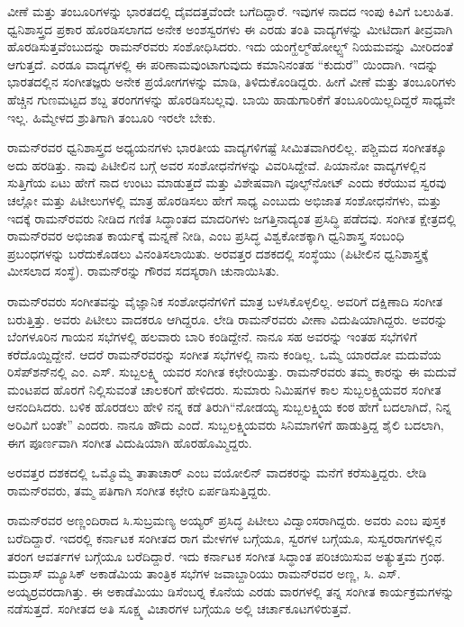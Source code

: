 ವೀಣೆ ಮತ್ತು ತಂಬೂರಿಗಳನ್ನು ಭಾರತದಲ್ಲಿ ದೈವದತ್ತವೆಂದೇ ಬಗೆದಿದ್ದಾರೆ. ಇವುಗಳ ನಾದದ ಇಂಪು ಕಿವಿಗೆ ಬಲುಹಿತ. ಧ್ವನಿಶಾಸ್ತ್ರದ ಪ್ರಕಾರ ಹೊರಡಿಸಲಾಗದ ಅನೇಕ ಅಂಶಸ್ವರಗಳು ಈ ಎರಡು ತಂತಿ ವಾದ್ಯಗಳನ್ನು ಮೀಟಿದಾಗ ತೀವ್ರವಾಗಿ ಹೊರಡಿಸುತ್ತವೆಂಬುದನ್ನು ರಾಮನ್‍ರವರು ಸಂಶೋಧಿಸಿದರು. ಇದು ಯಂಗ್\enginline{-}ಹೆಲ್ಮ್‌ಹೋಲ್ಟ್ಸ್ ನಿಯಮವನ್ನು ಮೀರಿದಂತೆ ಆಗುತ್ತದೆ. ಎರಡೂ ವಾದ್ಯಗಳಲ್ಲಿ ಈ ಪರಿಣಾಮವುಂಟಾಗುವುದು ಕಮಾನಿನಂತಹ “ಕುದುರೆ” ಯಿಂದಾಗಿ. ಇದನ್ನು ಭಾರತದಲ್ಲಿನ ಸಂಗೀತಜ್ಞರು ಅನೇಕ ಪ್ರಯೋಗಗಳನ್ನು ಮಾಡಿ, ತಿಳಿದುಕೊಂಡಿದ್ದರು. ಹೀಗೆ ವೀಣೆ ಮತ್ತು ತಂಬೂರಿಗಳು ಹೆಚ್ಚಿನ ಗುಣಮಟ್ಟದ ಶಬ್ದ ತರಂಗಗಳನ್ನು ಹೊರಡಿಸಬಲ್ಲವು. ಬಾಯಿ ಹಾಡುಗಾರಿಕೆಗೆ ತಂಬೂರಿಯಿಲ್ಲದಿದ್ದರೆ ಸಾಧ್ಯವೇ ಇಲ್ಲ. ಹಿಮ್ಮೇಳದ ಶ್ರುತಿಗಾಗಿ ತಂಬೂರಿ ಇರಲೇ ಬೇಕು.

ರಾಮನ್‍ರವರ ಧ್ವನಿಶಾಸ್ತ್ರದ ಅಧ್ಯಯನಗಳು ಭಾರತೀಯ ವಾದ್ಯಗಳಿಗಷ್ಟೆ ಸೀಮಿತವಾಗಿರಲಿಲ್ಲ. ಪಶ್ಚಿಮದ ಸಂಗೀತಕ್ಕೂ ಅದು ಹರಡಿತ್ತು. ನಾವು ಪಿಟೀಲಿನ ಬಗ್ಗೆ ಅವರ ಸಂಶೋಧನೆಗಳನ್ನು ವಿವರಿಸಿದ್ದೇವೆ. ಪಿಯಾನೋ ವಾದ್ಯಗಳಲ್ಲಿನ ಸುತ್ತಿಗೆಯ ಏಟು ಹೇಗೆ ನಾದ ಉಂಟು ಮಾಡುತ್ತದೆ ಮತ್ತು ವಿಶೇಷವಾಗಿ ವೂಲ್ಫ್‌ನೋಟ್ ಎಂದು ಕರೆಯುವ ಸ್ವರವು ಚಲ್ಲೋ ಮತ್ತು ಪಿಟೀಲುಗಳಲ್ಲಿ ಮಾತ್ರ ಹೊರಡಿಸಲು ಹೇಗೆ ಸಾಧ್ಯ ಎಂಬುದು ಅಭಿಜಾತ ಸಂಶೋಧನೆಗಳು, ಮತ್ತು ಇದಕ್ಕೆ ರಾಮನ್‍ರವರು ನೀಡಿದ ಗಣಿತ ಸಿದ್ಧಾಂತದ ಮಾದರಿಗಳು ಜಗತ್ತಿನಾದ್ಯಂತ ಪ್ರಸಿದ್ಧಿ ಪಡೆದವು. ಸಂಗೀತ ಕ್ಷೇತ್ರದಲ್ಲಿ ರಾಮನ್‍ರವರ ಅಭಿಜಾತ ಕಾರ್ಯಕ್ಕೆ ಮನ್ನಣೆ ನೀಡಿ, \textit{} ಎಂಬ ಪ್ರಸಿದ್ಧ ವಿಶ್ವಕೋಶಕ್ಕಾಗಿ ಧ್ವನಿಶಾಸ್ತ್ರ ಸಂಬಂಧಿ ಪ್ರಬಂಧಗಳನ್ನು ಬರೆದುಕೊಡಲು ವಿನಂತಿಸಲಾಯಿತು. ಅರವತ್ತರ ದಶಕದಲ್ಲಿ  ಸಂಸ್ಥೆಯು (ಪಿಟೀಲಿನ ಧ್ವನಿಶಾಸ್ತ್ರಕ್ಕೆ ಮೀಸಲಾದ ಸಂಸ್ಥೆ). ರಾಮನ್‍ರನ್ನು ಗೌರವ ಸದಸ್ಯರಾಗಿ ಚುನಾಯಿಸಿತು.

ರಾಮನ್‍ರವರು ಸಂಗೀತವನ್ನು ವೈಜ್ಞಾನಿಕ ಸಂಶೋಧನೆಗಳಿಗೆ ಮಾತ್ರ ಬಳಸಿಕೊಳ್ಳಲಿಲ್ಲ. ಅವರಿಗೆ ದಕ್ಷಿಣಾದಿ ಸಂಗೀತ ಬರುತ್ತಿತ್ತು. ಅವರು ಪಿಟೀಲು ವಾದಕರೂ ಆಗಿದ್ದರೂ. ಲೇಡಿ ರಾಮನ್‍ರವರು ವೀಣಾ ವಿದುಷಿಯಾಗಿದ್ದರು. ಅವರನ್ನು ಬೆಂಗಳೂರಿನ ಗಾಯನ ಸಭೆಗಳಲ್ಲಿ ಹಲವಾರು ಬಾರಿ ಕಂಡಿದ್ದೇನೆ. ನಾನೂ ಸಹ ಅವರನ್ನು ಇಂತಹ ಸಭೆಗಳಿಗೆ ಕರೆದೊಯ್ದಿದ್ದೇನೆ. ಆದರೆ ರಾಮನ್‍ರವರನ್ನು ಸಂಗೀತ ಸಭೆಗಳಲ್ಲಿ ನಾನು ಕಂಡಿಲ್ಲ. ಒಮ್ಮೆ ಯಾರದೋ ಮದುವೆಯ ರಿಸೆಪ್‍ಶನ್‍ನಲ್ಲಿ ಎಂ. ಎಸ್. ಸುಬ್ಬಲಕ್ಷ್ಮಿ ಯವರ ಸಂಗೀತ ಕಛೇರಿಯಿತ್ತು. ರಾಮನ್‍ರವರು ತಮ್ಮ ಕಾರನ್ನು ಈ ಮದುವೆ ಮಂಟಪದ ಹೊರಗೆ ನಿಲ್ಲಿಸುವಂತೆ ಚಾಲಕರಿಗೆ ಹೇಳಿದರು. ಸುಮಾರು  ನಿಮಿಷಗಳ ಕಾಲ ಸುಬ್ಬಲಕ್ಷ್ಮಿಯವರ ಸಂಗೀತ ಆನಂದಿಸಿದರು. ಬಳಿಕ ಹೊರಡಲು ಹೇಳಿ ನನ್ನ ಕಡೆ ತಿರುಗಿ\enginline{-}“ನೋಡಯ್ಯ ಸುಬ್ಬಲಕ್ಷ್ಮಿಯ ಕಂಠ ಹೇಗೆ ಬದಲಾಗಿದೆ, ನಿನ್ನ ಅರಿವಿಗೆ ಬಂತೇ” ಎಂದರು. ನಾನೂ ಹೌದು ಎಂದೆ. ಸುಬ್ಬಲಕ್ಷ್ಮಿಯವರು ಸಿನಿಮಾಗಳಿಗೆ ಹಾಡುತ್ತಿದ್ದ ಶೈಲಿ ಬದಲಾಗಿ, ಈಗ ಪೂರ್ಣವಾಗಿ ಸಂಗೀತ ವಿದುಷಿಯಾಗಿ ಹೊರಹೊಮ್ಮಿದ್ದರು.

ಅರವತ್ತರ ದಶಕದಲ್ಲಿ ಒಮ್ಮೊಮ್ಮೆ ತಾತಾಚಾರ್ ಎಂಬ ವಯೋಲಿನ್ ವಾದಕರನ್ನು ಮನೆಗೆ ಕರೆಸು\-ತ್ತಿದ್ದರು. ಲೇಡಿ ರಾಮನ್‍ರವರು, ತಮ್ಮ ಪತಿಗಾಗಿ ಸಂಗೀತ ಕಛೇರಿ ಏರ್ಪಡಿಸುತ್ತಿದ್ದರು.

ರಾಮನ್‍ರವರ ಅಣ್ಣಂದಿರಾದ ಸಿ.ಸುಬ್ರಮಣ್ಯ ಅಯ್ಯರ್ ಪ್ರಸಿದ್ಧ ಪಿಟೀಲು ವಿದ್ವಾಂಸರಾಗಿದ್ದರು. ಅವರು \textit{} ಎಂಬ ಪುಸ್ತಕ ಬರೆದಿದ್ದಾರೆ. ಇದರಲ್ಲಿ ಕರ್ನಾಟಕ ಸಂಗೀತದ ರಾಗ ಮೇಳಗಳ ಬಗ್ಗೆಯೂ, ಸ್ವರಗಳ ಬಗ್ಗೆಯೂ, ಸುಸ್ವರರಾಗಗಳಲ್ಲಿನ ತರಂಗ ಆವರ್ತಗಳ ಬಗ್ಗೆಯೂ ಬರೆದಿದ್ದಾರೆ. ಇದು ಕರ್ನಾಟಕ ಸಂಗೀತ ಸಿದ್ಧಾಂತ ಪರಿಚಯಿಸುವ ಅತ್ಯುತ್ತಮ ಗ್ರಂಥ. ಮದ್ರಾಸ್ ಮ್ಯೂಸಿಕ್ ಅಕಾಡೆಮಿಯ ತಾಂತ್ರಿಕ ಸಭೆಗಳ ಜವಾಬ್ದಾರಿಯು ರಾಮನ್‍ರವರ ಅಣ್ಣ, ಸಿ. ಎಸ್. ಅಯ್ಯರ್‍ರವರದಾಗಿತ್ತು. ಈ ಅಕಾಡೆಮಿಯು ಡಿಸೆಂಬರ್‍ನ ಕೊನೆಯ ಎರಡು ವಾರಗಳಲ್ಲಿ ತನ್ನ ಸಂಗೀತ ಕಾರ್ಯಕ್ರಮಗಳನ್ನು ನಡೆಸುತ್ತದೆ. ಸಂಗೀತದ ಅತಿ ಸೂಕ್ಷ್ಮ ವಿಚಾರಗಳ ಬಗ್ಗೆಯೂ ಅಲ್ಲಿ ಚರ್ಚಾಕೂಟಗಳಿರುತ್ತವೆ.


